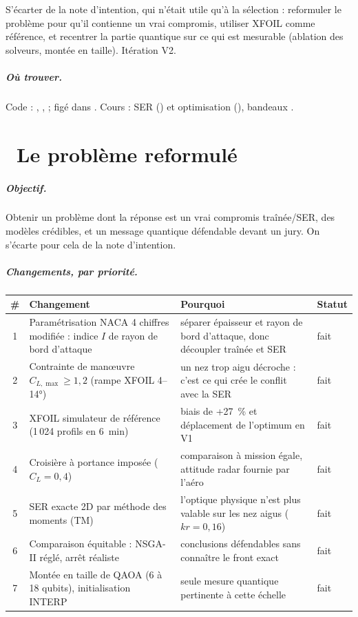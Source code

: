\documentclass[11pt,a4paper]{report}
\newcommand{\iterchapter}[2]{\chapter{\texorpdfstring{\protect\iterbadge{#1}\ }{#1 : }#2}\iterbanner{#1}}
\begin{document}
\begin{decision}
S'écarter de la note d'intention, qui n'était utile qu'à la sélection : reformuler le problème pour qu'il contienne un vrai compromis, utiliser XFOIL comme référence, et recentrer la partie quantique sur ce qui est mesurable (ablation des solveurs, montée en taille). Itération V2.
\end{decision}

\paragraph{Où trouver.} Code : , ,  ; figé dans . Cours : SER () et optimisation (), bandeaux .

\iterchapter{V2}{Le problème reformulé}
\paragraph{Objectif.} Obtenir un problème dont la réponse est un vrai compromis traînée/SER, des modèles crédibles, et un message quantique défendable devant un jury. On s'écarte pour cela de la note d'intention.

\paragraph{Changements, par priorité.}
\begin{center}
\renewcommand{\arraystretch}{1.2}
\begin{tabularx}{\linewidth}{c>{\raggedright\arraybackslash}p{4.6cm}X>{\raggedright\arraybackslash}p{1.3cm}}
\toprule
\# & Changement & Pourquoi & Statut \\
\midrule
1 & Paramétrisation NACA 4 chiffres modifiée : indice $I$ de rayon de bord d'attaque & séparer épaisseur et rayon de bord d'attaque, donc découpler traînée et SER & fait \\
2 & Contrainte de manœuvre $C_{L,\max}\ge1{,}2$ (rampe XFOIL 4--14°) & un nez trop aigu décroche : c'est ce qui crée le conflit avec la SER & fait \\
3 & XFOIL simulateur de référence (1\,024 profils en 6~min) & biais de +27~\% et déplacement de l'optimum en V1 & fait \\
4 & Croisière à portance imposée ($C_L=0{,}4$) & comparaison à mission égale, attitude radar fournie par l'aéro & fait \\
5 & SER exacte 2D par méthode des moments (TM) & l'optique physique n'est plus valable sur les nez aigus ($kr=0{,}16$) & fait \\
6 & Comparaison équitable : NSGA-II réglé, arrêt réaliste & conclusions défendables sans connaître le front exact & fait \\
7 & Montée en taille de QAOA (6 à 18 qubits), initialisation INTERP & seule mesure quantique pertinente à cette échelle & fait \\
\bottomrule
\end{tabularx}
\end{center}
\end{document}
